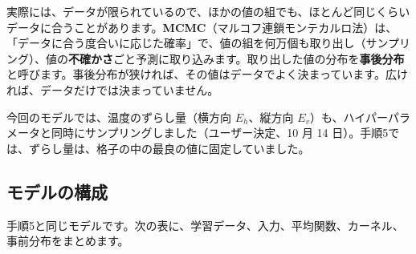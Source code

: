 \documentclass[paper=a4paper,fontsize=10.5pt,line_length=44zw,number_of_lines=38]{jlreq}
\newcommand{\Eh}{E_{h}}
\newcommand{\Ev}{E_{v}}
\begin{document}
実際には、データが限られているので、ほかの値の組でも、ほとんど同じくらいデータに合うことがあります。\textbf{MCMC}（マルコフ連鎖モンテカルロ法）は、「データに合う度合いに応じた確率」で、値の組を何万個も取り出し（サンプリング）、値の\textbf{不確かさ}ごと予測に取り込みます。取り出した値の分布を\textbf{事後分布}と呼びます。事後分布が狭ければ、その値はデータでよく決まっています。広ければ、データだけでは決まっていません。

今回のモデルでは、温度のずらし量（横方向 $\Eh$、縦方向 $\Ev$）も、ハイパーパラメータと同時にサンプリングしました（ユーザー決定、10 月 14 日）。手順5では、ずらし量は、格子の中の最良の値に固定していました。

\subsection{モデルの構成}
手順5と同じモデルです。次の表に、学習データ、入力、平均関数、カーネル、事前分布をまとめます。
\end{document}

